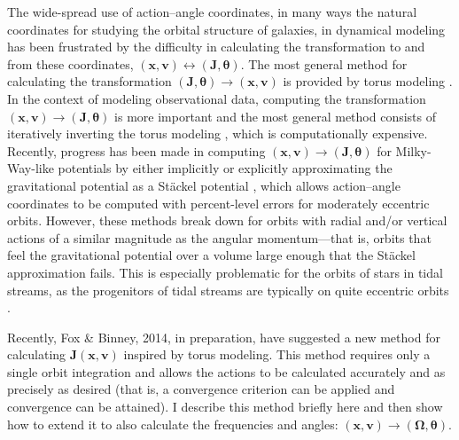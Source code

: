 \documentclass[12pt,preprint]{aastex}
\newcommand{\eg}{e.g.}
\renewcommand{\vec}[1]{\ensuremath{\mathbf{#1}}}
\newcommand{\vecx}{\ensuremath{\vec{x}}}
\newcommand{\vecv}{\ensuremath{\vec{v}}}
\newcommand{\vecj}{\ensuremath{\vec{J}}}
\newcommand{\veco}{\ensuremath{\vec{\Omega}}}
\newcommand{\veca}{\ensuremath{\boldsymbol\theta}}
\begin{document}
The wide-spread use of action--angle coordinates, in many ways the
natural coordinates for studying the orbital structure of galaxies, in
dynamical modeling has been frustrated by the difficulty in
calculating the transformation to and from these coordinates,
$(\vecx,\vecv) \leftrightarrow (\vecj,\veca)$. The most general method
for calculating the transformation $(\vecj,\veca) \rightarrow
(\vecx,\vecv)$ is provided by torus modeling \citep{McGill90a}. In the
context of modeling observational data, computing the transformation
$(\vecx,\vecv) \rightarrow (\vecj,\veca)$ is more important and the
most general method consists of iteratively inverting the torus
modeling \citep{McMillan08a}, which is computationally
expensive. Recently, progress has been made in computing
$(\vecx,\vecv) \rightarrow (\vecj,\veca)$ for Milky-Way-like
potentials by either implicitly or explicitly approximating the
gravitational potential as a St\"{a}ckel potential
\citep{Binney12a,Sanders12a}, which allows action--angle coordinates
to be computed with percent-level errors for moderately eccentric
orbits. However, these methods break down for orbits with radial
and/or vertical actions of a similar magnitude as the angular
momentum---that is, orbits that feel the gravitational potential over
a volume large enough that the St\"{a}ckel approximation fails. This
is especially problematic for the orbits of stars in tidal streams, as
the progenitors of tidal streams are typically on quite eccentric
orbits \citep[\eg,][]{Sanders13a}.

Recently, Fox \& Binney, 2014, in preparation, have suggested a new
method for calculating $\vecj(\vecx,\vecv)$ inspired by torus
modeling. This method requires only a single orbit integration and
allows the actions to be calculated accurately and as precisely as
desired (that is, a convergence criterion can be applied and
convergence can be attained). I describe this method briefly here and
then show how to extend it to also calculate the frequencies and
angles: $(\vecx,\vecv) \rightarrow (\veco,\veca)$.
\end{document}
